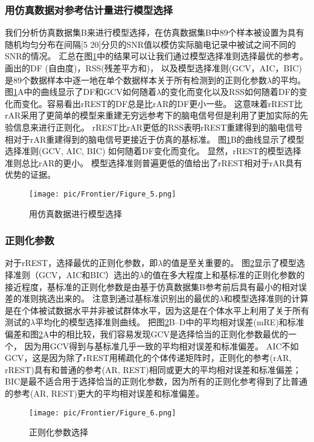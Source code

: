 \subsubsection{用仿真数据对参考估计量进行模型选择}
我们分析仿真数据集B来进行模型选择，在仿真数据集B中89个样本被设置为具有随机均匀分布在间隔[5 20]分贝的SNR值以模仿实际脑电记录中被试之间不同的SNR的情况。 汇总在图\ref{3.5}中的结果可以让我们通过模型选择准则选择最优的参考。 画出的DF (自由度)，RSS(残差平方和)， 以及模型选择准则(GCV，AIC，BIC) 是89个数据样本中逐一地在单个数据样本关于所有检测到的正则化参数$\lambda$的平均。
图\ref{3.5}A中的曲线显示了DF和GCV如何随着$\lambda$的变化而变化以及RSS如何随着DF的变化而变化。容易看出rREST的DF总是比rAR的DF更小一些。 这意味着rREST比rAR采用了更简单的模型来重建无穷远参考下的脑电信号但是利用了更加实际的先验信息来进行正则化。 rREST比rAR更低的RSS表明rREST重建得到的脑电信号相对于rAR重建得到的脑电信号更接近于仿真的基标准。 图\ref{3.5}B的曲线显示了模型选择准则(GCV, AIC, BIC) 如何随着DF变化而变化。 显然，rREST的模型选择准则总比rAR的更小。 模型选择准则普遍更低的值给出了rREST相对于rAR具有优势的证据。
\begin{figure}[!ht]
	\centering
	\texttt{[image: pic/Frontier/Figure\_5.png]}
	\caption{用仿真数据进行模型选择}
	\label{3.5}
\end{figure}

\subsubsection{正则化参数}
对于rREST，选择最优的正则化参数，即$\lambda$的值是至关重要的。 图\ref{3.6}显示了模型选择准则（GCV，AIC和BIC）选出的$\lambda$的值在多大程度上和基标准的正则化参数的接近程度，基标准的正则化参数是由基于仿真数据集B参考前后具有最小的相对误差的准则挑选出来的。 注意到通过基标准识别出的最优的$\lambda$和模型选择准则的计算是在个体被试数据水平并非被试群体水平，因为这是在个体水平上利用了关于所有测试的$\lambda$平均化的模型选择准则曲线。 把图\ref{3.6}B–D中的平均相对误差(mRE)和标准偏差和图\ref{3.6}A中的相比较，我们容易发现GCV是选择恰当的正则化参数最优的一个，
因为用GCV得到与基标准几乎一致的平均相对误差和标准偏差。 AIC不如GCV，这是因为除了rREST用稀疏化的个体传递矩阵时，正则化的参考(rAR, rREST)具有和普通的参考(AR, REST)相同或更大的平均相对误差和标准偏差； BIC是最不适合用于选择恰当的正则化参数，因为所有的正则化参考得到了比普通的参考(AR, REST)更大的平均相对误差和标准偏差。
\begin{figure}[!ht]
	\centering
	\texttt{[image: pic/Frontier/Figure\_6.png]}
	\caption{正则化参数选择}
	\label{3.6}
\end{figure}

